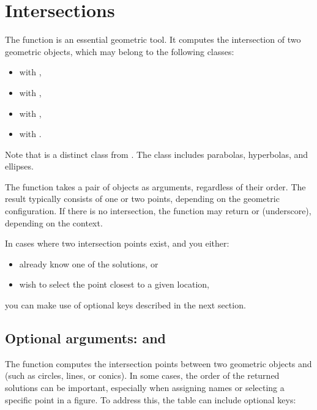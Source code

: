 \newpage
\section{Intersections}
\label{sec:intersections}

The  function is an essential geometric tool. It computes the intersection of two geometric objects, which may belong to the following classes:

\begin{itemize}
  \item {} with ,
  \item {} with ,
  \item {} with ,
  \item {} with .
\end{itemize}

\noindent
Note that  is a distinct class from . The  class includes parabolas, hyperbolas, and ellipses.

\medskip
\noindent
The function takes a pair of objects as arguments, regardless of their order. The result typically consists of one or two points, depending on the geometric configuration. If there is no intersection, the function may return  or \code{\_} (underscore), depending on the context.

\medskip
\noindent
In cases where two intersection points exist, and you either:
\begin{itemize}
  \item already know one of the solutions, or
  \item wish to select the point closest to a given location,
\end{itemize}
you can make use of optional keys described in the next section.


\subsection{Optional arguments:  and }

The function  computes the intersection points between two geometric objects  and  (such as circles, lines, or conics). In some cases, the order of the returned solutions can be important, especially when assigning names or selecting a specific point in a figure. To address this, the  table can include optional keys:

